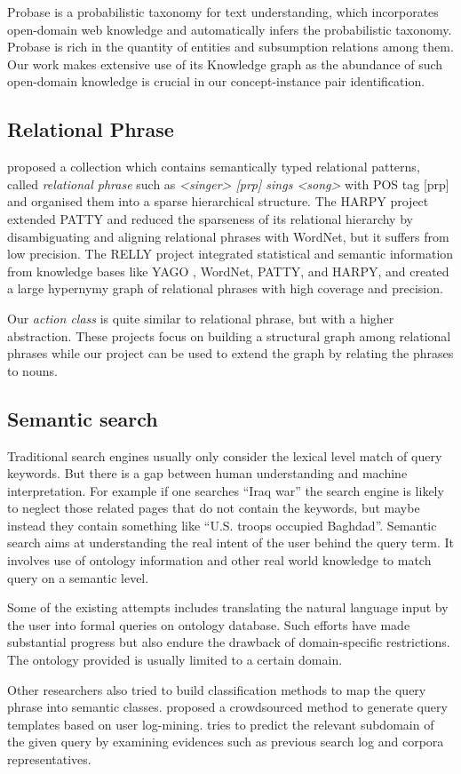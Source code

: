 Probase \cite{wu2012probase} is a probabilistic taxonomy for text understanding, which incorporates open-domain web knowledge and automatically
infers the probabilistic taxonomy.  Probase is rich in the quantity of entities and subsumption relations among them. Our work makes extensive
use of its Knowledge graph as the abundance of such open-domain knowledge is crucial in our concept-instance pair identification.

\subsection{Relational Phrase}
\cite{nakashole2012patty} proposed a collection which contains semantically typed relational patterns, called \emph{relational phrase} such as \emph{<singer> [prp] sings <song>} with POS tag [prp] and organised them into a sparse hierarchical structure. The HARPY\cite{grycner2014harpy} project extended PATTY and reduced the sparseness of its relational hierarchy by disambiguating and aligning relational phrases with WordNet, but it suffers from low precision. The RELLY \cite{grycner2015relly} project integrated statistical and semantic information from knowledge bases like YAGO \cite{suchanek2007yago}, WordNet, PATTY, and HARPY, and created a large hypernymy graph of relational phrases with high coverage and precision.

Our \emph{action class} is quite similar to relational phrase, but with a higher abstraction. These projects focus on building a structural graph among relational phrases while our project can be used to extend the graph by relating the phrases to nouns. 


\subsection{Semantic search}
Traditional search engines usually only consider the lexical level match of query keywords. But there is a gap between human understanding and
machine interpretation. For example if one searches ``Iraq war'' the search engine is likely to neglect those related pages that do not
contain the keywords, but maybe instead they contain something like ``U.S. troops occupied Baghdad''. Semantic search aims at understanding
the real intent of the user behind the query term.\cite{john2012semantic}
It involves use of ontology information and other real world knowledge to match query on a semantic level.

Some of the existing attempts includes translating the natural language input by the user into formal queries on ontology database.\cite{bonino2004ontology}
Such efforts have made substantial progress but also endure the drawback of domain-specific restrictions. The ontology provided is usually
limited to a certain domain.

Other researchers also tried to build classification methods to map the query phrase into semantic classes.
 \cite{demartini2013crowdq} proposed a crowdsourced method to generate query templates based on user log-mining.
 \cite{arguello2009sources} tries to predict the relevant subdomain of the given query by examining evidences such as
previous search log and corpora representatives.
